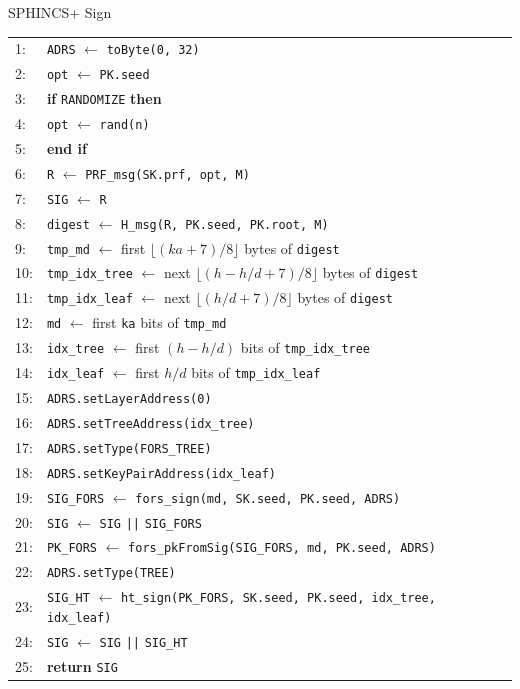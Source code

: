 \begin{subsection}{SPHINCS+ Sign}
\begin{algorithm}
    \begin{tabular}{ll}
    1:  & \texttt{ADRS} $\leftarrow$ \texttt{toByte(0, 32)} \\
    2:  & \texttt{opt}  $\leftarrow$ \texttt{PK.seed} \\
    3:  & \textbf{if} \texttt{RANDOMIZE} \textbf{then} \\
    4:  & \quad \texttt{opt}  $\leftarrow$ \texttt{rand(n)} \\
    5:  & \textbf{end if} \\
    6:  & \texttt{R}    $\leftarrow$ \texttt{PRF\_msg(SK.prf, opt, M)} \\
    7:  & \texttt{SIG}  $\leftarrow$ \texttt{R} \\
    8:  & \texttt{digest} $\leftarrow$ \texttt{H\_msg(R, PK.seed, PK.root, M)} \\
    9:  & \texttt{tmp\_md}       $\leftarrow$ first $\lfloor(\mathit{ka}+7)/8\rfloor$ bytes of \texttt{digest} \\
    10: & \texttt{tmp\_idx\_tree} $\leftarrow$ next $\lfloor(h - h/d +7)/8\rfloor$ bytes of \texttt{digest} \\
    11: & \texttt{tmp\_idx\_leaf} $\leftarrow$ next $\lfloor(h/d +7)/8\rfloor$ bytes of \texttt{digest} \\
    12: & \texttt{md}      $\leftarrow$ first \texttt{ka} bits of \texttt{tmp\_md} \\
    13: & \texttt{idx\_tree} $\leftarrow$ first $(h - h/d)$ bits of \texttt{tmp\_idx\_tree} \\
    14: & \texttt{idx\_leaf} $\leftarrow$ first $h/d$ bits of \texttt{tmp\_idx\_leaf} \\
    15: & \texttt{ADRS.setLayerAddress(0)} \\
    16: & \texttt{ADRS.setTreeAddress(idx\_tree)} \\
    17: & \texttt{ADRS.setType(FORS\_TREE)} \\
    18: & \texttt{ADRS.setKeyPairAddress(idx\_leaf)} \\
    19: & \texttt{SIG\_FORS} $\leftarrow$ \texttt{fors\_sign(md, SK.seed, PK.seed, ADRS)} \\
    20: & \texttt{SIG}      $\leftarrow$ \texttt{SIG} \texttt{||} \texttt{SIG\_FORS} \\
    21: & \texttt{PK\_FORS} $\leftarrow$ \texttt{fors\_pkFromSig(SIG\_FORS, md, PK.seed, ADRS)} \\
    22: & \texttt{ADRS.setType(TREE)} \\
    23: & \texttt{SIG\_HT}   $\leftarrow$ \texttt{ht\_sign(PK\_FORS, SK.seed, PK.seed, idx\_tree, idx\_leaf)} \\
    24: & \texttt{SIG}      $\leftarrow$ \texttt{SIG} \texttt{||} \texttt{SIG\_HT} \\
    25: & \textbf{return} \texttt{SIG}
    \end{tabular}
\end{algorithm}




\end{subsection}

